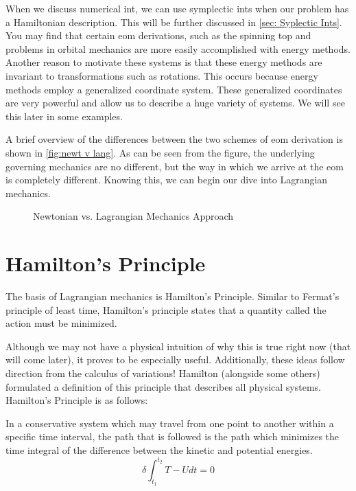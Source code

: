 When we discuss \gls{numerical int}, we can use \glspl{symplectic int} when our problem has a \gls{Hamiltonian} description. This will be further discussed in \autoref{sec: Syplectic Ints}. You may find that certain \gls{eom} derivations, such as the spinning top and problems in orbital mechanics are more easily accomplished with energy methods. Another reason to motivate these systems is that these energy methods are invariant to transformations such as rotations. This occurs because energy methods employ a generalized coordinate system. These generalized coordinates are very powerful and allow us to describe a huge variety of systems. We will see this later in some examples.

A brief overview of the differences between the two schemes of \gls{eom} derivation is shown in \autoref{fig:newt v lang}. As can be seen from the figure, the underlying governing mechanics are no different, but the way in which we arrive at the \gls{eom} is completely different. Knowing this, we can begin our dive into \gls{Lagrangian} mechanics.

\begin{figure}[ht]
    \centering
    


    \caption{Newtonian vs. Lagrangian Mechanics Approach}
    \label{fig:newt v lang}
\end{figure}

\section{Hamilton's Principle}
The basis of \gls{Lagrangian} mechanics is Hamilton's Principle. Similar to Fermat's principle of least time, Hamilton's principle states that a quantity called the \gls{action} must be minimized.

Although we may not have a physical intuition of why this is true right now (that will come later), it proves to be especially useful. Additionally, these ideas follow direction from the calculus of variations! Hamilton (alongside some others) formulated a definition of this principle that describes all physical systems. Hamilton's Principle is as follows:
\begin{theorem}
In a conservative system which may travel from one point to another within a specific time interval, the path that is followed is the path which minimizes the time integral of the difference between the kinetic and potential energies.
$$\delta \int_{t_1}^{t_2}{T-U}{dt}=0$$
\end{theorem}

